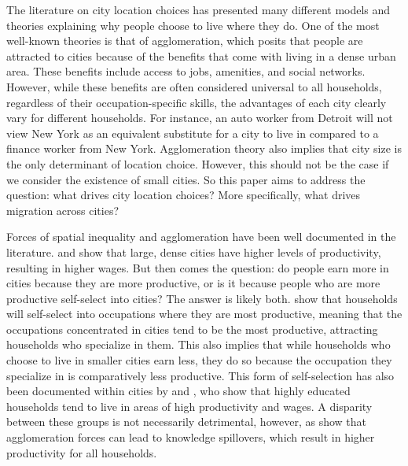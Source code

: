 \documentclass[10pt]{article}
\begin{document}
The literature on city location choices has presented many different models and theories explaining why people choose to live where they do. One of the most well-known theories is that of agglomeration, which posits that people are attracted to cities because of the benefits that come with living in a dense urban area. These benefits include access to jobs, amenities, and social networks. However, while these benefits are often considered universal to all households, regardless of their occupation-specific skills, the advantages of each city clearly vary for different households. For instance, an auto worker from Detroit will not view New York as an equivalent substitute for a city to live in compared to a finance worker from New York. Agglomeration theory also implies that city size is the only determinant of location choice. However, this should not be the case if we consider the existence of small cities. So this paper aims to address the question: what drives city location choices? More specifically, what drives migration across cities?

Forces of spatial inequality and agglomeration have been well documented in the literature. \cite{behrens2014} and \cite{br2015} show that large, dense cities have higher levels of productivity, resulting in higher wages. But then comes the question: do people earn more in cities because they are more productive, or is it because people who are more productive self-select into cities? The answer is likely both. \cite{lagakos_waugh2013} show that households will self-select into occupations where they are most productive, meaning that the occupations concentrated in cities tend to be the most productive, attracting households who specialize in them. This also implies that while households who choose to live in smaller cities earn less, they do so because the occupation they specialize in is comparatively less productive. This form of self-selection has also been documented within cities by \cite{diamond} and \cite{diamond2022}, who show that highly educated households tend to live in areas of high productivity and wages. A disparity between these groups is not necessarily detrimental, however, as \cite{dandd} show that agglomeration forces can lead to knowledge spillovers, which result in higher productivity for all households.
\end{document}
